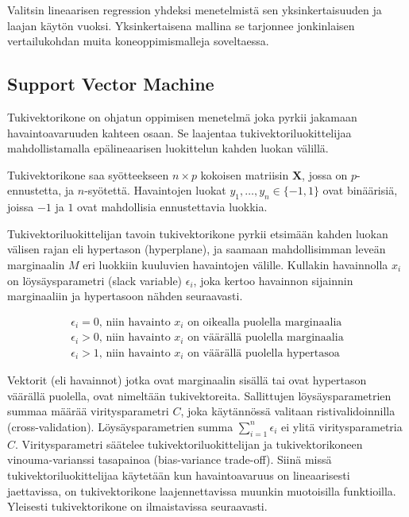 \documentclass[finnish,twoside,openright]{HYgraduMLDS}
\begin{document}
Valitsin lineaarisen regression yhdeksi menetelmistä sen yksinkertaisuuden ja laajan käytön vuoksi. Yksinkertaisena mallina se tarjonnee jonkinlaisen vertailukohdan muita koneoppimismalleja soveltaessa.


\subsection{Support Vector Machine}

Tukivektorikone on ohjatun oppimisen menetelmä joka pyrkii jakamaan havaintoavaruuden kahteen osaan. Se laajentaa tukivektoriluokittelijaa mahdollistamalla epälineaarisen luokittelun kahden luokan välillä\cite{james2013ISLR}.

Tukivektorikone saa syötteekseen $n \times p$ kokoisen matriisin $\textbf{X}$, jossa on $p$-ennustetta, ja $n$-syötettä. Havaintojen luokat $y_1, \dots, y_n \in \{-1, 1\}$ ovat binäärisiä, joissa $-1$ ja $1$ ovat mahdollisia ennustettavia luokkia. 

Tukivektoriluokittelijan tavoin tukivektorikone pyrkii etsimään kahden luokan välisen rajan eli hypertason (hyperplane), ja saamaan mahdollisimman leveän marginaalin $M$ eri luokkiin kuuluvien havaintojen välille. Kullakin havainnolla $x_i$ on löysäysparametri (slack variable) $\epsilon_i$, joka kertoo havainnon sijainnin marginaaliin ja hypertasoon nähden seuraavasti. 

\begin{gather}
    \epsilon_i = 0\text{, niin havainto $x_i$ on oikealla puolella marginaalia}\\
    \epsilon_i > 0\text{, niin havainto $x_i$ on väärällä puolella marginaalia}\\
    \epsilon_i > 1\text{, niin havainto $x_i$ on väärällä puolella hypertasoa}
\end{gather}

Vektorit (eli havainnot) jotka ovat marginaalin sisällä tai ovat hypertason väärällä puolella, ovat nimeltään tukivektoreita. Sallittujen löysäysparametrien summaa määrää viritysparametri $C$, joka käytännössä valitaan ristivalidoinnilla (cross-validation). Löysäysparametrien summa $\sum^n_{i=1} \epsilon_i$ ei ylitä viritysparametria $C$. Viritysparametri säätelee tukivektoriluokittelijan ja tukivektorikoneen vinouma-varianssi tasapainoa (bias-variance trade-off). Siinä missä tukivektoriluokittelijaa käytetään kun havaintoavaruus on lineaarisesti jaettavissa, on tukivektorikone laajennettavissa muunkin muotoisilla funktioilla. Yleisesti tukivektorikone on ilmaistavissa seuraavasti.
\end{document}
